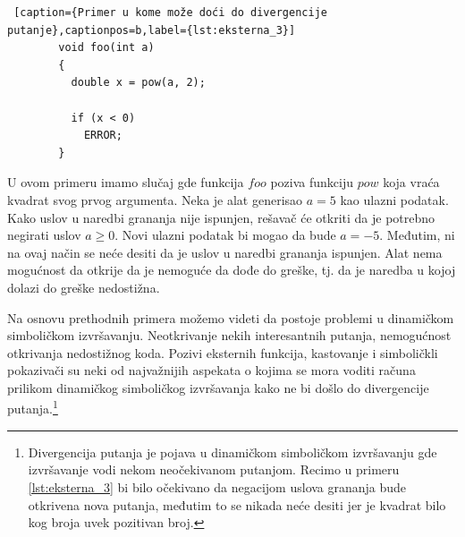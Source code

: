 \documentclass[12pt,oneside]{memoir}
\begin{document}
    \begin{lstlisting} [caption={Primer u kome može doći do divergencije putanje},captionpos=b,label={lst:eksterna_3}]
        void foo(int a)
        {
          double x = pow(a, 2);
          
          if (x < 0)
            ERROR;
        }
    \end{lstlisting}
\bigbreak

U ovom primeru imamo slučaj gde funkcija $foo$ poziva funkciju $pow$ koja vraća kvadrat svog prvog argumenta. Neka je alat generisao $a = 5$ kao ulazni podatak. Kako uslov u naredbi grananja nije ispunjen, rešavač će otkriti da je potrebno negirati uslov $a \geq 0$. Novi ulazni podatak bi mogao da bude $a = -5$. Međutim, ni na ovaj način se neće desiti da je uslov u naredbi grananja ispunjen. Alat nema mogućnost da otkrije da je nemoguće da dođe do greške, tj. da je naredba u kojoj dolazi do greške nedostižna. 

Na osnovu prethodnih primera možemo videti da postoje problemi u dinamičkom simboličkom izvršavanju. Neotkrivanje nekih interesantnih putanja, nemogućnost otkrivanja nedostižnog koda. Pozivi eksternih funkcija, kastovanje i simboličkli pokazivači su neki od najvažnijih aspekata o kojima se mora voditi računa prilikom dinamičkog simboličkog izvršavanja kako ne bi došlo do divergencije putanja.\footnote[1]{Divergencija putanja je pojava u dinamičkom simboličkom izvršavanju gde izvršavanje vodi nekom neočekivanom putanjom. Recimo u primeru \ref{lst:eksterna_3} bi bilo očekivano da negacijom uslova grananja bude otkrivena nova putanja, međutim to se nikada neće desiti jer je kvadrat bilo kog broja uvek pozitivan broj.}
\end{document}
